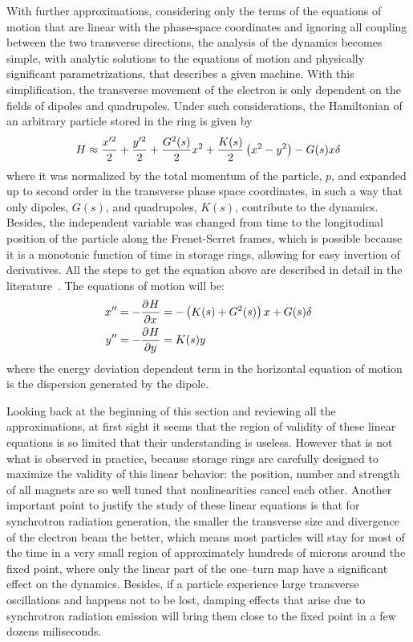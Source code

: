 	With further approximations, considering only the terms of the equations of motion that are linear with the phase-space coordinates and ignoring all coupling between the two transverse directions, the analysis of the dynamics becomes simple, with analytic solutions to the equations of motion and physically significant parametrizations, that describes a given machine. With this simplification, the transverse movement of the electron is only dependent on the fields of dipoles and quadrupoles. Under such considerations, the Hamiltonian of an arbitrary particle stored in the ring is given by
    \begin{align}\label{eq:approximated_hamiltonian}
        H \approx \frac{x'^2}{2} + \frac{y'^2}{2} + \frac{G^2(s)}{2}x^2 + \frac{K(s)}{2}\left(x^2-y^2\right) - G(s)x\delta
    \end{align}
    where it was normalized by the total momentum of the particle, $p$, and expanded up to second order in the transverse phase space coordinates, in such a way that only dipoles, $G(s)$, and quadrupoles, $K(s)$, contribute to the dynamics. Besides, the independent variable was changed from time to the longitudinal position of the particle along the Frenet-Serret frames, which is possible because it is a monotonic function of time in storage rings, allowing for easy invertion of derivatives. All the steps to get the equation above are described in detail in the literature~\cite{Bengtsson1997,Lee1999,Wiedemann2007}. The equations of motion will be:
    \begin{align}\label{eq:linear_equation_motion}
        x'' &= -\frac{\partial^{{}}H}{\partial x^{{}}} = -\left(K(s)+G^2(s)\right)x + G(s)\delta\\\nonumber
        y'' &= -\frac{\partial^{{}}H}{\partial y^{{}}} = K(s)y
    \end{align}
    where the energy deviation dependent term in the horizontal equation of motion is the dispersion generated by the dipole.

	Looking back at the beginning of this section and reviewing all the approximations, at first sight it seems that the region of validity of these linear equations is so limited that their understanding is useless. However that is not what is observed in practice, because storage rings are carefully designed to maximize the validity of this linear behavior: the position, number and strength of all magnets are so well tuned that nonlinearities cancel each other. Another important point to justify the study of these linear equations is that for synchrotron radiation generation, the smaller the transverse size and divergence of the electron beam the better, which means most particles will stay for most of the time in a very small region of approximately hundreds of microns around the fixed point, where only the linear part of the one--turn map have a significant effect on the dynamics. Besides, if a particle experience large transverse oscillations and happens not to be lost, damping effects that arise due to synchrotron radiation emission will bring them close to the fixed point in a few dozens miliseconds.


